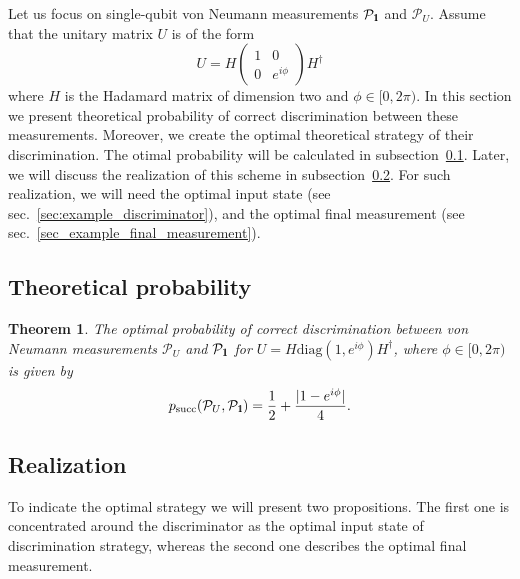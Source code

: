 \documentclass[preprint,12pt, a4paper]{elsarticle}
\newcommand{\1}{{\rm 1\hspace{-0.9mm}l}}
\newcommand{\Id}{{\rm 1\hspace{-0.9mm}l}}
\newcommand{\ee}{\ensuremath{\mathrm{e}}}
\newcommand{\ii}{\ensuremath{\mathrm{i}}}
\newcommand{\PP}{\mathcal{P}}
\newcommand{\diag}{\mathrm{diag}}
\newtheorem{theorem}{Theorem}
\begin{document}
Let us focus on single-qubit von Neumann measurements $\PP_\1$ and $\PP_U$.
Assume that the unitary matrix $U$ is of the form 
\begin{equation}
U = H 
\left(\begin{array}{cc}1&0\\0&e^{i \phi}\end{array}\right)  H^\dagger
\end{equation}
where $H$ is the Hadamard matrix of dimension two and $\phi \in [0, 2 \pi)$.
In this section we present theoretical probability of correct 
discrimination between these measurements. Moreover, we create the optimal 
theoretical strategy of their discrimination. 
The otimal probability will be calculated in 
subsection~\ref{sec:example_theoretical_probability}. Later, we will 
discuss the realization of this scheme in 
subsection~\ref{sec:example_realization}. For such realization, we 
will need the optimal input state (see sec.~\ref{sec:example_discriminator}), 
and the optimal final measurement (see sec.~\ref{sec_example_final_measurement}). 

\subsection{Theoretical probability}\label{sec:example_theoretical_probability}

\begin{theorem}\label{th:probability}
The optimal probability of correct discrimination between von Neumann
measurements $\PP_U$ and $\PP_{\Id}$ for $U = H \diag(1, e^{i \phi}) H^\dagger$,
where $\phi \in [0, 2\pi)$ is given by
\begin{equation}
p_{\text{succ}}(\PP_{U}, \PP_{\Id}) = \frac{1}{2} + \frac{|1 - e^{i \phi}  |}{4} . 
\end{equation}
\end{theorem}






\subsection{Realization}\label{sec:example_realization}



To indicate the optimal strategy  we will present two propositions. The first one is concentrated around the discriminator as the optimal input state of discrimination strategy, whereas the second one describes the optimal final measurement. 
 
\end{document}
